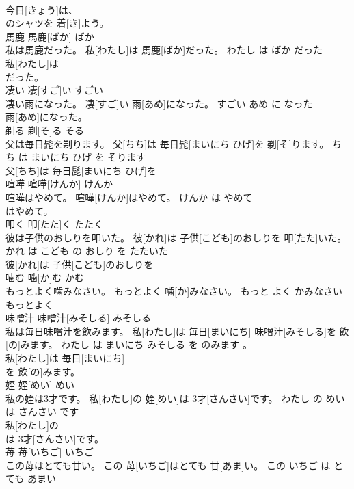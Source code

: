 \documentclass[8pt]{extreport}
\begin{document}
\begin{CJK}{UTF8}{min}
\\	今日[きょう]は、
\\	のシャツを 着[き]よう。		
\\	馬鹿	馬鹿[ばか]	ばか	
\\	私は馬鹿だった。	私[わたし]は 馬鹿[ばか]だった。	わたし は ばか だった	
\\	私[わたし]は
\\	だった。		
\\	凄い	凄[すご]い	すごい	
\\	凄い雨になった。	凄[すご]い 雨[あめ]になった。	すごい あめ に なった	
\\	雨[あめ]になった。		
\\	剃る	剃[そ]る	そる	
\\	父は毎日髭を剃ります。	父[ちち]は 毎日髭[まいにち ひげ]を 剃[そ]ります。	ちち は まいにち ひげ を そります	
\\	父[ちち]は 毎日髭[まいにち ひげ]を
\\	喧嘩	喧嘩[けんか]	けんか	
\\	喧嘩はやめて。	喧嘩[けんか]はやめて。	けんか は やめて	
\\	はやめて。		
\\	叩く	叩[たた]く	たたく	
\\	彼は子供のおしりを叩いた。	彼[かれ]は 子供[こども]のおしりを 叩[たた]いた。	かれ は こども の おしり を たたいた	
\\	彼[かれ]は 子供[こども]のおしりを
\\	噛む	噛[か]む	かむ	
\\	もっとよく噛みなさい。	もっとよく 噛[か]みなさい。	もっと よく かみなさい	
\\	もっとよく
\\	味噌汁	味噌汁[みそしる]	みそしる	
\\	私は毎日味噌汁を飲みます。	私[わたし]は 毎日[まいにち] 味噌汁[みそしる]を 飲[の]みます。	わたし は まいにち みそしる を のみます 。	
\\	私[わたし]は 毎日[まいにち]
\\	を 飲[の]みます。		
\\	姪	姪[めい]	めい	
\\	私の姪は3才です。	私[わたし]の 姪[めい]は 3才[さんさい]です。	わたし の めい は さんさい です	
\\	私[わたし]の
\\	は 3才[さんさい]です。		
\\	苺	苺[いちご]	いちご	
\\	この苺はとても甘い。	この 苺[いちご]はとても 甘[あま]い。	この いちご は とても あまい	

\end{CJK}
\end{document}
